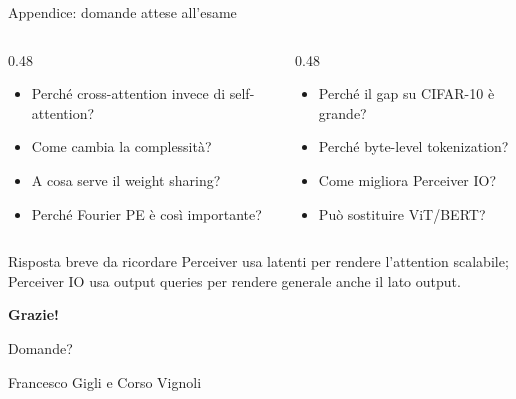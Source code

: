 \documentclass[aspectratio=169,10pt]{beamer}
\begin{document}
\begin{frame}{Appendice: domande attese all'esame}
\small
\begin{columns}[T]
\begin{column}{0.48\textwidth}
\begin{itemize}
  \item Perché cross-attention invece di self-attention?
  \item Come cambia la complessità?
  \item A cosa serve il weight sharing?
  \item Perché Fourier PE è così importante?
\end{itemize}
\end{column}
\begin{column}{0.48\textwidth}
\begin{itemize}
  \item Perché il gap su CIFAR-10 è grande?
  \item Perché byte-level tokenization?
  \item Come migliora Perceiver IO?
  \item Può sostituire ViT/BERT?
\end{itemize}
\end{column}
\end{columns}

\begin{block}{Risposta breve da ricordare}
Perceiver usa latenti per rendere l'attention scalabile; Perceiver IO usa output queries per rendere generale anche il lato output.
\end{block}
\end{frame}

\begin{frame}[plain]
\centering
\vfill
{\Huge\color{DeepBlue}\textbf{Grazie!}}

\vspace{1em}
{\Large Domande?}

\vspace{2em}
Francesco Gigli e Corso Vignoli
\vfill
\end{frame}
\end{document}
